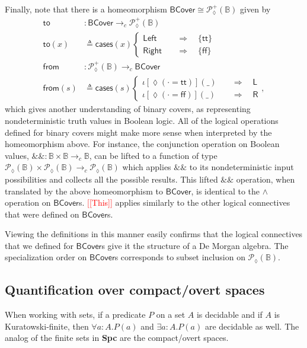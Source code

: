 \documentclass[conference]{IEEEtran}
\newcommand{\PLower}{\mathcal{P}_\lozenge}
\newcommand{\cto}{\to_c}
\newcommand{\bool}{\mathbb{B}}
\newcommand{\wildcard}{\_}
\newcommand{\oinclf}[1]{\iota[{#1}]}
\newcommand{\oincl}[2]{\oinclf{#1} \left({#2}\right)}
\newcommand{\Branch}{\Rightarrow}
\newcommand{\note}[1]{\textcolor{red}{[[{#1}]]}}
\begin{document}
Finally, note that there is a homeomorphism $\mathsf{BCover} \cong \PLower^+(\bool)$ given by
\begin{align*}
\mathsf{to} &: \mathsf{BCover} \cto \PLower^+(\bool)
\\ \mathsf{to}(x) &\triangleq
  \mathsf{cases}(x)
  \begin{cases}
\mathsf{Left}
 \quad &\Branch \quad
 \{ \mathsf{tt} \}
\\
\mathsf{Right}
 \quad &\Branch \quad
 \{ \mathsf{ff} \}
  \end{cases}
\\
\mathsf{from} &: \PLower^+(\bool) \cto \mathsf{BCover}
\\ \mathsf{from}(s) &\triangleq
  \mathsf{cases}(s)
  \begin{cases}
 \oincl{\lozenge(\cdot = \mathsf{tt})}{\wildcard}
 \quad &\Branch \quad
 \mathsf{L}
\\
 \oincl{\lozenge(\cdot = \mathsf{ff})}{\wildcard}
 \quad &\Branch \quad
 \mathsf{R}
  \end{cases},
\end{align*}
which gives another understanding of binary covers, as representing nondeterministic truth values in Boolean logic. All of the logical operations defined for binary covers might make more sense when interpreted by the homeomorphism above. For instance, the conjunction operation on Boolean values,
$\&\& : \bool \times \bool \cto \bool$, can be lifted to a function of type $\PLower(\bool) \times \PLower(\bool) \cto \PLower(\bool)$ which applies $\&\&$ to its nondeterministic input possibilities and collects all the possible results. This lifted $\&\&$ operation, when translated by the above homeomorphism to $\mathsf{BCover}$, is identical to the $\wedge$ operation on $\mathsf{BCover}$s. \note{This} applies similarly to the other logical connectives that were defined on $\mathsf{BCover}$s.

Viewing the definitions in this manner easily confirms that the logical connectives that we defined for $\mathsf{BCover}$s give it the structure of a De Morgan algebra.
The specialization order on $\mathsf{BCover}$s corresponds to subset inclusion on $\PLower(\bool)$.

\subsection{Quantification over compact/overt spaces}

When working with sets, if a predicate $P$ on a set $A$ is decidable and if $A$ is Kuratowski-finite, then $\forall a : A. P(a)$ and $\exists a : A. P(a)$ are decidable as well. The analog of the finite sets in \textbf{Spc} are the compact/overt spaces.
\end{document}
